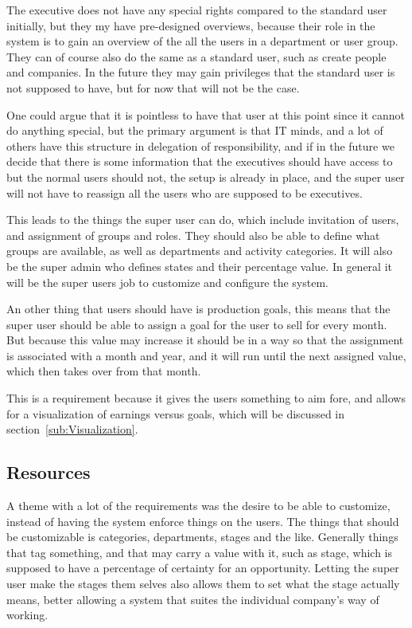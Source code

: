 The executive does not have any special rights compared to the standard user
initially, but they my have pre-designed overviews, because their role in the
system is to gain an overview of the all the users in a department or user
group. They can of course also do the same as a standard user, such as create
people and companies. In the future they may gain privileges that the standard
user is not supposed to have, but for now that will not be the case. 

One could argue that it is pointless to have that user at this point since it
cannot do anything special, but the primary argument is that IT minds, and a lot
of others have this structure in delegation of responsibility, and if in the
future we decide that there is some information that the executives should have
access to but the normal users should not, the setup is already in place, and
the super user will not have to reassign all the users who are supposed to be
executives. 

This leads to the things the super user can do, which include invitation of
users, and assignment of groups and roles. They should also be able to define
what groups are available, as well as departments and activity categories. It
will also be the super admin who defines states and their percentage value. In
general it will be the super users job to customize and configure the system.

An other thing that users should have is production goals, this means that the
super user should be able to assign a goal for the user to sell for every month.
But because this value may increase it should be in a way so that the assignment
is associated with a month and year, and it will run until the next assigned
value, which then takes over from that month. 

This is a requirement because it gives the users something to aim fore, and allows for a visualization of earnings versus goals, which will be discussed in section~\ref{sub:Visualization}.

\subsection{Resources}
\label{sub:Resources}

A theme with a lot of the requirements was the desire to be able to customize,
instead of having the system enforce things on the users. The things that should
be customizable is categories, departments, stages and the like. Generally
things that tag something, and that may carry a value with it, such as stage,
which is supposed to have a percentage of certainty for an opportunity. Letting
the super user make the stages them selves also allows them to set what the
stage actually means, better allowing a system that suites the individual company's way
of working. 

